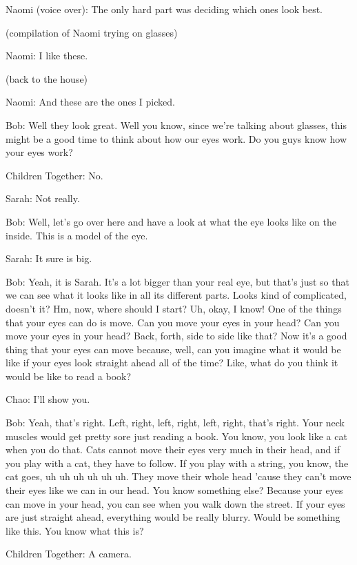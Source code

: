 Naomi (voice over): The only hard part was deciding which ones look best.

(compilation of Naomi trying on glasses)

Naomi: I like these.

(back to the house)

Naomi: And these are the ones I picked.

Bob: Well they look great. Well you know, since we're talking about glasses, this might be a good time to think about how our eyes work. Do you guys know how your eyes work?

Children Together: No.

Sarah: Not really.

Bob: Well, let's go over here and have a look at what the eye looks like on the inside. This is a model of the eye.

Sarah: It sure is big.

Bob: Yeah, it is Sarah. It's a lot bigger than your real eye, but that's just so that we can see what it looks like in all its different parts. Looks kind of complicated, doesn't it? Hm, now, where should I start? Uh, okay, I know! One of the things that your eyes can do is move. Can you move your eyes in your head? Can you move your eyes in your head? Back, forth, side to side like that? Now it's a good thing that your eyes can move because, well, can you imagine what it would be like if your eyes look straight ahead all of the time? Like, what do you think it would be like to read a book?

Chao: I'll show you.

Bob: Yeah, that's right. Left, right, left, right, left, right, that's right. Your neck muscles would get pretty sore just reading a book. You know, you look like a cat when you do that. Cats cannot move their eyes very much in their head, and if you play with a cat, they have to follow. If you play with a string, you know, the cat goes, uh uh uh uh uh uh. They move their whole head 'cause they can't move their eyes like we can in our head. You know something else? Because your eyes can move in your head, you can see when you walk down the street. If your eyes are just straight ahead, everything would be really blurry. Would be something like this. You know what this is?

Children Together: A camera.

